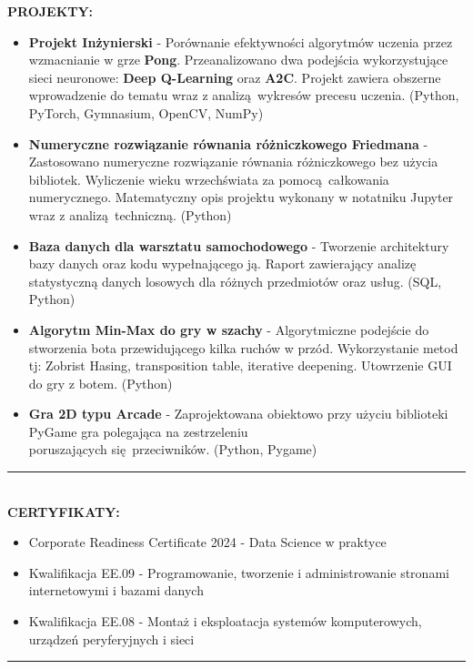 \documentclass[10pt]{article}
\begin{document}
\noindent \fontsize{14pt}{14pt}\selectfont \textbf{\color{Violet}PROJEKTY:}
\fontsize{10pt}{10pt}\selectfont
\begin{itemize}[leftmargin=*]
    \item \textbf{Projekt Inżynierski} - Porównanie efektywności algorytmów uczenia przez wzmacnianie w grze \textbf{Pong}. 
    Przeanalizowano dwa podejścia wykorzystujące sieci neuronowe: \textbf{Deep Q-Learning} oraz \textbf{A2C}.
    Projekt zawiera obszerne wprowadzenie do tematu wraz z analizą wykresów precesu uczenia. (Python, PyTorch, Gymnasium, OpenCV, NumPy)
    \item \textbf{Numeryczne rozwiązanie równania różniczkowego Friedmana} - Zastosowano numeryczne rozwiązanie równania różniczkowego bez użycia bibliotek.
    Wyliczenie wieku wrzechświata za pomocą całkowania numerycznego. Matematyczny opis projektu wykonany w notatniku Jupyter wraz z analizą techniczną. (Python)
    \item \textbf{Baza danych dla warsztatu samochodowego} - Tworzenie architektury bazy danych oraz kodu wypełnającego ją. 
    Raport zawierający analizę statystyczną danych losowych dla różnych przedmiotów oraz usług. (SQL, Python)
    \item \textbf{Algorytm Min-Max do gry w szachy} - Algorytmiczne podejście do stworzenia bota przewidującego kilka ruchów w przód. Wykorzystanie metod tj: Zobrist Hasing, transposition table, iterative deepening. Utowrzenie GUI do gry z botem. (Python)
    \item \textbf{Gra 2D typu Arcade} - Zaprojektowana obiektowo przy użyciu biblioteki PyGame gra polegająca na zestrzeleniu \\ poruszających się przeciwników. (Python, Pygame)
\end{itemize}
\rule{17cm}{1pt} \\

\noindent \fontsize{14pt}{14pt}\selectfont \textbf{\color{Violet}CERTYFIKATY:}
\fontsize{10pt}{10pt}\selectfont
\begin{itemize}[leftmargin=*]
    \item Corporate Readiness Certificate 2024 - Data Science w praktyce
    \item Kwalifikacja EE.09 - Programowanie, tworzenie i administrowanie stronami internetowymi i bazami danych
    \item Kwalifikacja EE.08 - Montaż i eksploatacja systemów komputerowych, urządzeń peryferyjnych i sieci
\end{itemize}
\rule{17cm}{1pt} \\
\end{document}
